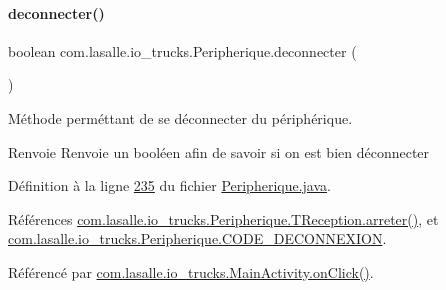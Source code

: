 \paragraph{\texorpdfstring{deconnecter()}{deconnecter()}}
{\footnotesize\ttfamily boolean com.\+lasalle.\+io\+\_\+trucks.\+Peripherique.\+deconnecter (\begin{DoxyParamCaption}{ }\end{DoxyParamCaption})}



Méthode perméttant de se déconnecter du périphérique. 

\begin{DoxyReturn}{Renvoie}
Renvoie un booléen afin de savoir si on est bien déconnecter 
\end{DoxyReturn}


Définition à la ligne \hyperlink{_peripherique_8java_source_l00235}{235} du fichier \hyperlink{_peripherique_8java_source}{Peripherique.\+java}.



Références \hyperlink{_peripherique_8java_source_l00312}{com.\+lasalle.\+io\+\_\+trucks.\+Peripherique.\+T\+Reception.\+arreter()}, et \hyperlink{_peripherique_8java_source_l00036}{com.\+lasalle.\+io\+\_\+trucks.\+Peripherique.\+C\+O\+D\+E\+\_\+\+D\+E\+C\+O\+N\+N\+E\+X\+I\+ON}.



Référencé par \hyperlink{_main_activity_8java_source_l00131}{com.\+lasalle.\+io\+\_\+trucks.\+Main\+Activity.\+on\+Click()}.


